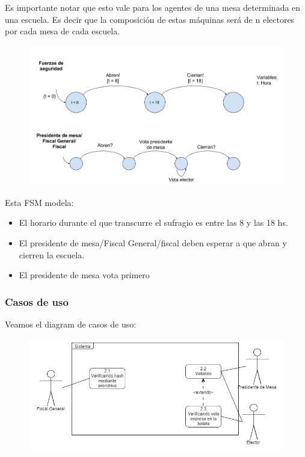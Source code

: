 Es importante notar que esto vale para los agentes de una mesa determinada en una escuela. Es decir que la composición de estas máquinas será de n electores por cada mesa de cada escuela.
\newpage
\begin{figure}[h!]
\centering
\includegraphics[scale=0.45]{imagenes/FSMs/Sufragio/Horariodesufragio}
\end{figure}

Esta FSM modela:
\begin{itemize}
\item El horario durante el que transcurre el sufragio es entre las 8 y las 18 hs.
\item El presidente de mesa/Fiscal General/fiscal deben esperar a que abran y cierren la escuela.
\item El presidente de mesa vota primero

\end{itemize}

\subsubsection{Casos de uso}

Veamos el diagram de casos de uso:

\begin{figure}[h!]
\centering
\includegraphics[scale=0.45]{imagenes/CU/casosdeusosufragio}
\end{figure}


